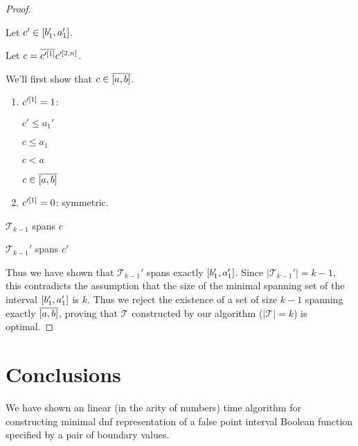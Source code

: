 \documentclass{article}
\begin{document}
\begin{proof}
\begin{enumerate}
Let $c' \in [b_1', a_1']$.

Let $c = \overline{c'^{[1]}} c'^{[2, n]}$.

We'll first show that $c \in \overline{[a, b]}$.

\begin{enumerate}
\item $c'^{[1]} = 1$:

$c' \leq a_1'$

$c \leq a_1$

$c < a$

$c \in \overline{[a, b]}$
\item $c'^{[1]} = 0$: symmetric.
\end{enumerate}

$\mathcal{T}_{k-1}$ spans $c$

$\mathcal{T}_{k-1}'$ spans $c'$
\end{enumerate}

Thus we have shown that $\mathcal{T}_{k-1}'$
spans exactly $[b_1', a_1']$.
Since $|\mathcal{T}_{k-1}'| = k-1$,
this contradicts the assumption that
the size of the minimal spanning set of the interval
$[b_1', a_1']$ is $k$.
Thus we reject the existence of a set of size $k-1$
spanning exactly $\overline{[a, b]}$,
proving that $\mathcal{T}$ constructed by our algorithm
($|\mathcal{T}| = k$)
is optimal.
\end{proof}

\section{Conclusions}
We have shown an linear (in the arity of numbers) time algorithm
for constructing minimal \acrshort{dnf} representation
of a false point interval Boolean function
specified by a pair of boundary values.



\printglossaries
\end{document}
